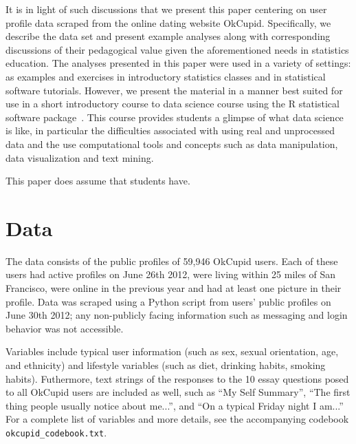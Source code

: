 \documentclass{article}\usepackage[]{graphicx}\usepackage[]{color}
\begin{document}
It is in light of such discussions that we present this paper centering on user profile data scraped from the online dating website OkCupid.  Specifically, we describe the data set and present example analyses along with corresponding discussions of their pedagogical value given the aforementioned needs in statistics education.  The analyses presented in this paper were used in a variety of settings: as examples and exercises in introductory statistics classes and in statistical software tutorials.  However, we present the material in a manner best suited for use in a short introductory course to data science course using the R statistical software package~\cite{R}. This course provides students a glimpse of what data science is like, in particular the difficulties associated with using real and unprocessed data and the use computational tools and concepts such as data manipulation, data visualization and text mining.

This paper does assume that students have.  










%
\section{Data}
%
The data consists of the public profiles of 59,946 OkCupid users. Each of these users had active profiles on June 26th 2012, were living within 25 miles of San Francisco, were online in the previous year and had at least one picture in their profile. Data was scraped using a Python script from users' public profiles on June 30th 2012; any non-publicly facing information such as messaging and login behavior was not accessible.  

Variables include typical user information (such as sex, sexual orientation, age, and ethnicity) and lifestyle variables (such as diet, drinking habits, smoking habits).  Futhermore, text strings of the responses to the 10 essay questions posed to all OkCupid users are included as well, such as ``My Self Summary'', ``The first thing people usually notice about me...'', and ``On a typical Friday night I am...''  For a complete list of variables and more details, see the accompanying codebook \verb#okcupid_codebook.txt#.
\end{document}
